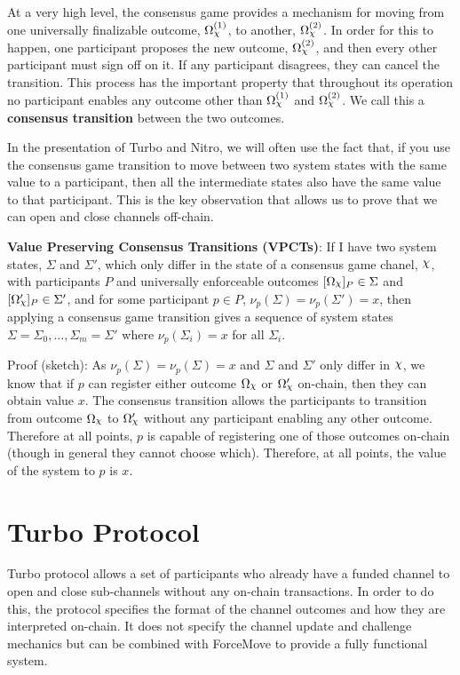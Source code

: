 \documentclass{article}
\DeclareRobustCommand{\rchi}{{\mathpalette\irchi\relax}}
\newcommand{\irchi}[2]{\raisebox{\depth}{$#1\chi$}} %
\theoremstyle{definition}
\newcommand{\enf}[1]{[#1]}
\begin{document}
At a very high level, the consensus game provides a mechanism for moving from one universally
finalizable outcome, $\Omega_\rchi^{(1)}$, to another, $\Omega_\rchi^{(2)}$. 
In order for this to happen, one participant proposes the new outcome, $\Omega_\rchi^{(2)}$, and then
every other participant must sign off on it. 
If any participant disagrees, they can cancel the transition.
This process has the important property that throughout its operation no participant enables
any outcome other than $\Omega_\rchi^{(1)}$ and $\Omega_\rchi^{(2)}$.
We call this a \textbf{consensus transition} between the two outcomes.

In the presentation of Turbo and Nitro, we will often use the fact that, if you use the
consensus game transition to move between two system states with the same value to a
participant, then all the intermediate states also have the same value to that participant.
This is the key observation that allows us to prove that we can open and close channels
off-chain.

\textbf{Value Preserving Consensus Transitions (VPCTs)}:
If I have two system states, $\Sigma$ and $\Sigma'$, which only differ in the state of
a consensus game chanel, $\rchi$, with participants $P$ and universally enforceable outcomes
$\enf{\Omega_\rchi}_P \in \Sigma$ and $\enf{\Omega'_\rchi}_P \in \Sigma'$, and 
for some participant $p \in P$, $\nu_p(\Sigma) = \nu_p(\Sigma') = x$, then
applying a consensus game transition gives a sequence of system states 
$\Sigma = \Sigma_0, \dots, \Sigma_m = \Sigma'$ where $\nu_p(\Sigma_i) = x$ for all $\Sigma_i$.

Proof (sketch): As $\nu_p(\Sigma) = \nu_p(\Sigma) = x$ and $\Sigma$ and $\Sigma'$ only differ
in $\rchi$, we know that if $p$ can register either outcome $\Omega_\rchi$ or $\Omega'_\rchi$ on-chain, then
they can obtain value $x$. The consensus transition allows the participants to transition
from outcome $\Omega_\rchi$ to $\Omega'_\rchi$ without any participant enabling any other outcome.
Therefore at all points, $p$ is capable of registering one of those outcomes on-chain (though
in general they cannot choose which).
Therefore, at all points, the value of the system to $p$ is $x$.

\section{Turbo Protocol}

Turbo protocol allows a set of participants who already have a funded channel to open and
close sub-channels without any on-chain transactions. 
In order to do this, the protocol specifies the format of the channel outcomes and how
they are interpreted on-chain.
It does not specify the channel update and challenge mechanics but can be combined with
ForceMove to provide a fully functional system.
\end{document}
